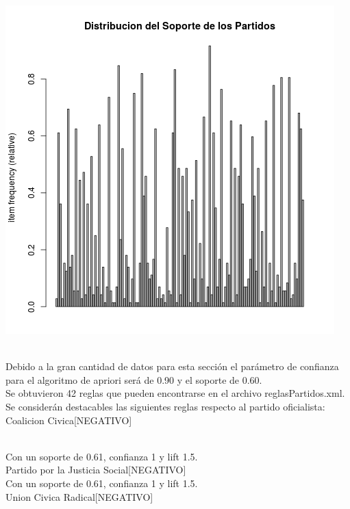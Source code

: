 \documentclass{endm}
\begin{document}
\begin{center}
\includegraphics[scale=0.4]{graficos/soportesPartidos.png}
\end{center}  \\

Debido a la gran cantidad de datos para esta sección el parámetro de confianza para el algoritmo de apriori será de 0.90 y el soporte de 0.60. \\

Se obtuvieron 42 reglas que pueden encontrarse en el archivo reglasPartidos.xml.  \\

Se considerán destacables las siguientes reglas respecto al partido oficialista: \\

{Coalicion Civica[NEGATIVO]} 

\\ Con un soporte de 0.61, confianza 1 y lift 1.5.\\

{Partido por la Justicia Social[NEGATIVO]}  \\

Con un soporte de 0.61, confianza 1 y lift 1.5.\\

{Union Civica Radical[NEGATIVO]}  \\
\end{document}
